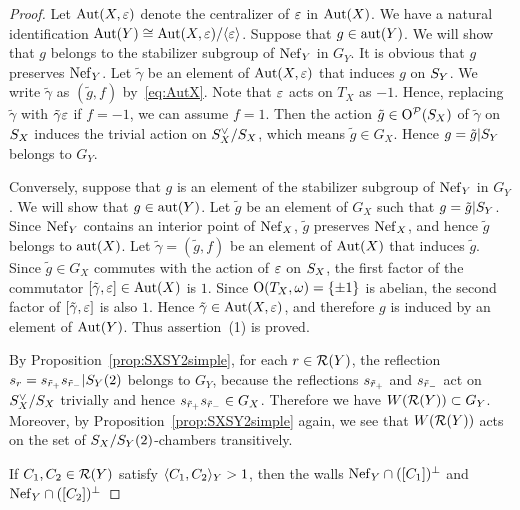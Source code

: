 \documentclass{amsart}
\numberwithin{procedure}{section}
\begin{document}
\begin{proof}
\par
Let $\operatorname{\mathrm{Aut}}\nolimits(X, \varepsilon)$ denote the centralizer of $\varepsilon$ in $\operatorname{\mathrm{Aut}}\nolimits(X)$.
We have a natural identification $\operatorname{\mathrm{Aut}}\nolimits(Y)\cong \operatorname{\mathrm{Aut}}\nolimits(X, \varepsilon)/\langle {\varepsilon} \rangle$.
Suppose that $g\in \mathord{\rm{aut}}(Y)$.
We will show that $g$ belongs to the stabilizer subgroup of $\mathord{\rm Nef}_{Y}$ in $G_Y$.
It is obvious that $g$ preserves $\mathord{\rm Nef}_{Y}$.
Let $\tilde{\gamma}$ be an element  of $\operatorname{\mathrm{Aut}}\nolimits(X, \varepsilon)$
that induces $g$ on $S_{Y}$.
We write $\tilde{\gamma}$ as $(\tilde{g}, f)$ by~\eqref{eq:AutX}.
Note that $\varepsilon$  acts on $T_X$ as $-1$.
Hence, replacing $\tilde{\gamma}  $ with $\tilde{\gamma}\varepsilon  $ if  $f=-1$,
we can assume $f=1$.
Then the action $\tilde{g}\in \mathord{\mathrm{O}}^{\mathord{\mathcal P}}(S_{X})$ of $\tilde{\gamma}$ on $S_{X}$
induces the trivial action  on $S_{X}\sp{\vee}/S_{X}$, which means  $\tilde{g}\in G_X$.
Hence $g=\tilde{g}|S_{Y}$ belongs to $G_Y$.
\par
Conversely, 
suppose that $g$ is an element of  the stabilizer subgroup of $\mathord{\rm Nef}_{Y}$ in $G_Y$.
We will show that $g\in \mathord{\rm{aut}}(Y)$.
Let $\tilde{g}$ be an element of $G_X$  such that $g=\tilde{g}|S_{Y}$.
Since $\mathord{\rm Nef}_{Y}$ contains an interior point of $\mathord{\rm Nef}_{X}$,
$\tilde{g}$  preserves $\mathord{\rm Nef}_{X}$,
and hence $\tilde{g}$ belongs to $\mathord{\rm{aut}}(X)$.
Let $\tilde{\gamma}  =(\tilde{g}, f)$ be an element of $\operatorname{\mathrm{Aut}}\nolimits(X)$ that induces $\tilde{g}$.
Since   $\tilde{g}\in G_X$ commutes with the action of $\varepsilon$ on $S_{X}$,
the first factor of the commutator $[\tilde{\gamma}, \varepsilon]\in \operatorname{\mathrm{Aut}}\nolimits(X)$ is $1$.
Since $\mathord{\mathrm{O}}(T_X, \omega)=\{\pm 1\}$ is abelian, the second factor  of $[\tilde{\gamma}, \varepsilon]$
is also $1$.
Hence $\tilde{\gamma} \in \operatorname{\mathrm{Aut}}\nolimits(X, \varepsilon)$,
and therefore $g$ is induced by an element of $\operatorname{\mathrm{Aut}}\nolimits(Y)$.
Thus  assertion~(1) is proved.
\par
By Proposition~\ref{prop:SXSY2simple}, 
for each $r\in \mathord{\mathcal R}(Y)$,
the reflection $s_r=s_{\tilde{r}_+} s_{\tilde{r}_-}|S_{Y}(2)$ belongs to $G_Y$,
because the reflections $s_{\tilde{r}_+}$ and  $s_{\tilde{r}_-}$ 
act on $S_{X}\sp{\vee}/S_{X}$ trivially and hence $s_{\tilde{r}_+} s_{\tilde{r}_-}\in G_X$.
Therefore we have $W(\mathord{\mathcal R}(Y))\subset G_Y$.
Moreover, 
by Proposition~\ref{prop:SXSY2simple} again, 
we see that $W(\mathord{\mathcal R}(Y))$ acts on the set of $S_{X}/S_{Y}(2)$-chambers transitively.
\par
If   $C_1, C_2\in \mathord{\mathcal R}(Y)$ 
satisfy
$\langle C_1, C_2 \rangle_Y>1$,
then the walls $\mathord{\rm Nef}_{Y}\cap ([C_1])\sp{\perp}$ and   $\mathord{\rm Nef}_{Y}\cap ([C_2])\sp{\perp}$ 

\end{proof}
\end{document}
